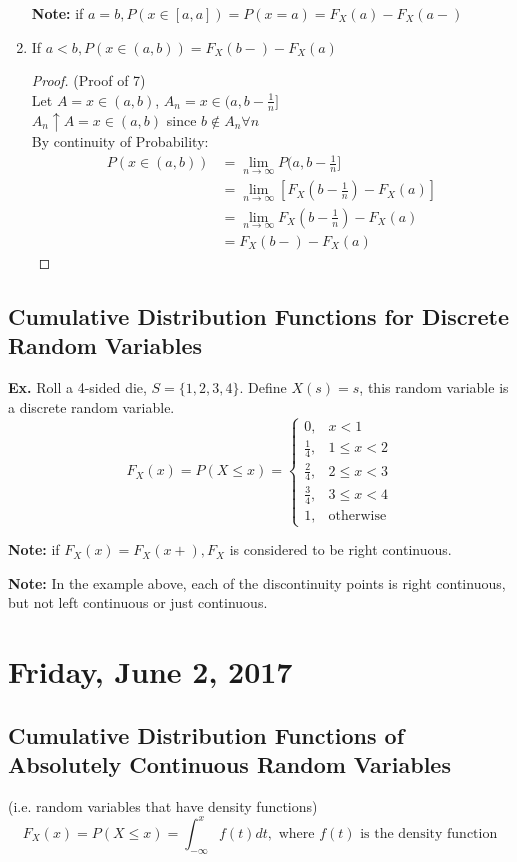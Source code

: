 \documentclass[12pt]{article}
\begin{document}
\begin{enumerate}
{	\textbf{Note:} if $a=b, P(x \in [a,a]) = P(x=a) = F_X (a) - F_X (a-)$
	}
	\item{
	If $a < b, P(x \in (a,b)) = F_X (b-) - F_X (a)$
	\begin{proof}
		(Proof of 7)\\
		Let $A = x \in (a,b)$, $A_n = x \in (a,b-\frac{1}{n}]$\\
		$A_n \uparrow A = x \in (a,b)$ since $b \not\in A_n \forall n$\\
		By continuity of Probability:
		\begin{align*}
		P(x\in (a,b)) &= \lim_{n\to\infty} P(a,b-\frac{1}{n}]\\
		&= \lim_{n\to\infty} [F_X (b - \frac{1}{n}) - F_X (a)]\\
		&= \lim_{n\to\infty} F_X (b - \frac{1}{n}) - F_X (a)\\
		&= F_X (b-) - F_X (a)
		\end{align*}

	\end{proof}
	}
\end{enumerate}

\subsection{Cumulative Distribution Functions for Discrete Random Variables}

\textbf{Ex.} Roll a 4-sided die, $S = \{ 1,2,3,4 \}$. Define $X(s)=s$, this random variable is a discrete random variable.
$$F_X (x) = P(X \leq x) = \begin{cases}
0, & x < 1\\
\frac{1}{4}, & 1 \leq x < 2\\
\frac{2}{4}, & 2 \leq x < 3\\
\frac{3}{4}, & 3 \leq x < 4\\
1, & \text{otherwise}
\end{cases}
$$

\textbf{Note:} if $F_X (x) = F_X (x+), F_X$ is considered to be right continuous.

\textbf{Note:} In the example above, each of the discontinuity points is right continuous, but not left continuous or just continuous.

\newpage

\section{Friday, June 2, 2017}

\subsection{Cumulative Distribution Functions of Absolutely Continuous Random Variables}
(i.e. random variables that have density functions)
$$F_X (x) = P(X \leq x) = \int^x_{-\infty} f(t) dt, \text{ where $f(t)$ is the density function}$$
\end{document}
